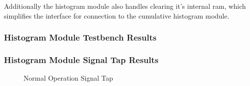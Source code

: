 \documentclass[12pt]{article}
\begin{document}
  Additionally the histogram module also handles clearing it's internal ram, which simplifies the interface for connection to the cumulative histogram module.
  
  \subsubsection{Histogram Module Testbench Results}
  
  \subsubsection{Histogram Module Signal Tap Results}
    \begin{figure}[H]
    \caption{Normal Operation Signal Tap}
    \label{fig:histogram_signal_tap_normal_operation}
  \end{figure}
\end{document}
